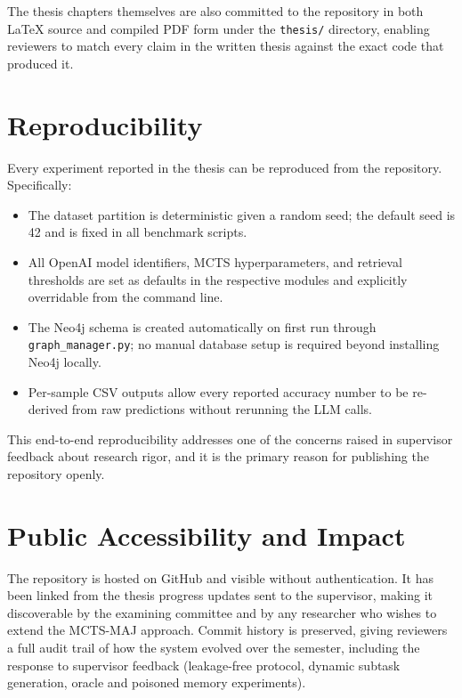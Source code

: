 \documentclass[12pt,a4paper]{article}
\begin{document}
The thesis chapters themselves are also committed to the repository in both LaTeX source and compiled PDF form under the \texttt{thesis/} directory, enabling reviewers to match every claim in the written thesis against the exact code that produced it.

\section{Reproducibility}

Every experiment reported in the thesis can be reproduced from the repository. Specifically:

\begin{itemize}
    \item The dataset partition is deterministic given a random seed; the default seed is 42 and is fixed in all benchmark scripts.
    \item All OpenAI model identifiers, MCTS hyperparameters, and retrieval thresholds are set as defaults in the respective modules and explicitly overridable from the command line.
    \item The Neo4j schema is created automatically on first run through \texttt{graph\_manager.py}; no manual database setup is required beyond installing Neo4j locally.
    \item Per-sample CSV outputs allow every reported accuracy number to be re-derived from raw predictions without rerunning the LLM calls.
\end{itemize}

This end-to-end reproducibility addresses one of the concerns raised in supervisor feedback about research rigor, and it is the primary reason for publishing the repository openly.

\section{Public Accessibility and Impact}

The repository is hosted on GitHub and visible without authentication. It has been linked from the thesis progress updates sent to the supervisor, making it discoverable by the examining committee and by any researcher who wishes to extend the MCTS-MAJ approach. Commit history is preserved, giving reviewers a full audit trail of how the system evolved over the semester, including the response to supervisor feedback (leakage-free protocol, dynamic subtask generation, oracle and poisoned memory experiments).
\end{document}
